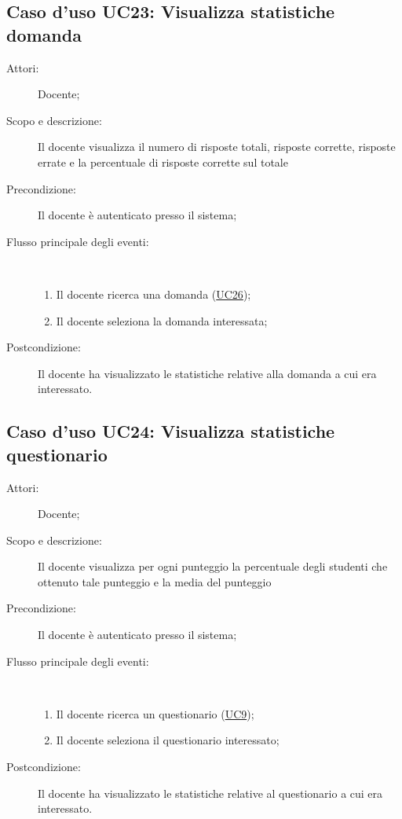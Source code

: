 \subsection{Caso d'uso UC23: Visualizza statistiche domanda}\begin{description}
\item[Attori:] Docente;
\item[Scopo e descrizione:] Il docente visualizza il numero di risposte totali, risposte corrette, risposte errate e la percentuale di risposte corrette sul totale
      \item[Precondizione:] Il docente è autenticato presso il sistema;

        \item[Flusso principale degli eventi:] \ 
 \begin{enumerate}
          \item Il docente ricerca una domanda (\hyperlink{UC26}{UC26});
          \item Il docente seleziona la domanda interessata;

      \end{enumerate}
    \item[Postcondizione:] Il docente ha visualizzato le statistiche relative alla domanda a cui era interessato.
  \end{description}
\hypertarget{UC24}{}
\subsection{Caso d'uso UC24: Visualizza statistiche questionario}\begin{description}
\item[Attori:] Docente;
\item[Scopo e descrizione:] Il docente visualizza per ogni punteggio la percentuale degli studenti che ottenuto tale punteggio e la media del punteggio
      \item[Precondizione:] Il docente è autenticato presso il sistema;

        \item[Flusso principale degli eventi:] \ 
 \begin{enumerate}
          \item Il docente ricerca un questionario (\hyperlink{UC9}{UC9});
          \item Il docente seleziona il questionario interessato;

      \end{enumerate}
    \item[Postcondizione:] Il docente ha visualizzato le statistiche relative al questionario a cui era interessato.
  \end{description}
\hypertarget{UC25}{}
